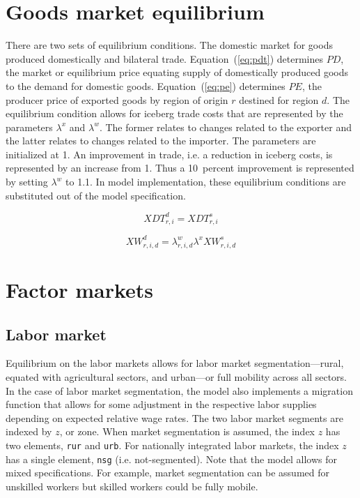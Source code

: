 \documentclass[11pt,letterpaper]{report}
\begin{document}
\section{Goods market equilibrium}
\renewcommand{\theequation}{{E-}\arabic{equation}}
\setcounter{equation}{0}

There are two sets of equilibrium conditions. The domestic market for goods
produced domestically and bilateral trade. Equation~(\ref{eq:pdt}) determines
$\mathit{PD}$, the market or equilibrium price equating supply of domestically
produced goods to the demand for domestic goods. Equation~(\ref{eq:pe})
determines $\mathit{PE}$, the producer price of exported goods by region of
origin $r$ destined for region $d$. The equilibrium condition allows for iceberg
trade costs that are represented by the parameters $\lambda^x$ and $\lambda^w$.
The former relates to changes related to the exporter and the latter
relates to changes related to the importer.
The parameters are
initialized at 1. An improvement in trade, i.e. a reduction in iceberg costs, is
represented by an increase from 1. Thus a 10~percent improvement is represented
by setting $\lambda^w$ to 1.1. In model implementation, these equilibrium
conditions are substituted out of the model specification.

\begin{equation}
\label{eq:pdt}
\mathit{XDT}^d_{r,i} = \mathit{XDT}^s_{r,i}
\end{equation}

\begin{equation}
\label{eq:pe}
\mathit{XW}^d_{r,i,d} = \lambda^w_{r,i,d} \lambda^x \mathit{XW}^s_{r,i,d}
\end{equation}

\section{Factor markets}
\renewcommand{\theequation}{{F-}\arabic{equation}}
\setcounter{equation}{0}

\subsection{Labor market}

Equilibrium on the labor markets allows for labor market segmentation---rural,
equated with agricultural sectors, and urban---or full mobility across all
sectors. In the case of labor market segmentation, the model also implements a
migration function that allows for some adjustment in the respective labor
supplies depending on expected relative wage rates. The two labor market
segments are indexed by $z$, or zone. When market segmentation is assumed,
the index $z$ has two elements, \texttt{rur} and \texttt{urb}. For nationally
integrated labor markets, the index $z$ has a single element, \texttt{nsg}
(i.e. not-segmented). Note that the model allows for mixed specifications.
For example, market segmentation can be assumed for unskilled workers but
skilled workers could be fully mobile.
\end{document}
